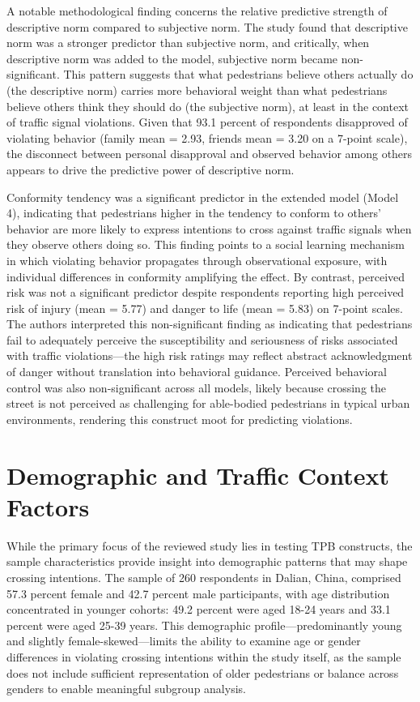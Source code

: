 \documentclass{article}
\begin{document}
A notable methodological finding concerns the relative predictive strength of descriptive norm compared to subjective norm. The study found that descriptive norm was a stronger predictor than subjective norm, and critically, when descriptive norm was added to the model, subjective norm became non-significant. This pattern suggests that what pedestrians believe others actually do (the descriptive norm) carries more behavioral weight than what pedestrians believe others think they should do (the subjective norm), at least in the context of traffic signal violations. Given that 93.1 percent of respondents disapproved of violating behavior (family mean = 2.93, friends mean = 3.20 on a 7-point scale), the disconnect between personal disapproval and observed behavior among others appears to drive the predictive power of descriptive norm. \cite{08_2016_zhou_aap}

Conformity tendency was a significant predictor in the extended model (Model 4), indicating that pedestrians higher in the tendency to conform to others' behavior are more likely to express intentions to cross against traffic signals when they observe others doing so. This finding points to a social learning mechanism in which violating behavior propagates through observational exposure, with individual differences in conformity amplifying the effect. By contrast, perceived risk was not a significant predictor despite respondents reporting high perceived risk of injury (mean = 5.77) and danger to life (mean = 5.83) on 7-point scales. The authors interpreted this non-significant finding as indicating that pedestrians fail to adequately perceive the susceptibility and seriousness of risks associated with traffic violations—the high risk ratings may reflect abstract acknowledgment of danger without translation into behavioral guidance. Perceived behavioral control was also non-significant across all models, likely because crossing the street is not perceived as challenging for able-bodied pedestrians in typical urban environments, rendering this construct moot for predicting violations. \cite{08_2016_zhou_aap}

\section{Demographic and Traffic Context Factors}
While the primary focus of the reviewed study lies in testing TPB constructs, the sample characteristics provide insight into demographic patterns that may shape crossing intentions. The sample of 260 respondents in Dalian, China, comprised 57.3 percent female and 42.7 percent male participants, with age distribution concentrated in younger cohorts: 49.2 percent were aged 18-24 years and 33.1 percent were aged 25-39 years. This demographic profile—predominantly young and slightly female-skewed—limits the ability to examine age or gender differences in violating crossing intentions within the study itself, as the sample does not include sufficient representation of older pedestrians or balance across genders to enable meaningful subgroup analysis. \cite{08_2016_zhou_aap}
\end{document}
